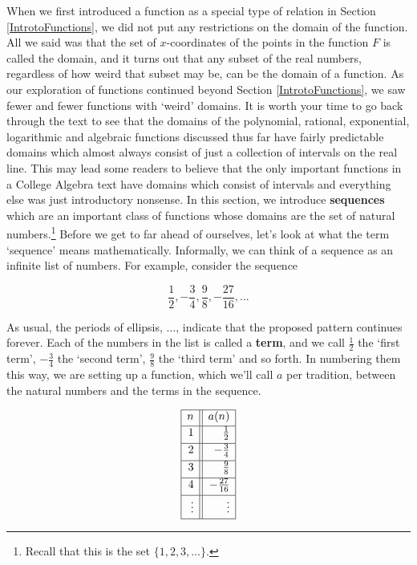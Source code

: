 

\setcounter{footnote}{0}

\label{Sequences}

When we first introduced a function as a special type of relation in Section \ref{IntrotoFunctions}, we did not put any restrictions on the domain of the function.  All we said was that the set of $x$-coordinates of the points in the function $F$ is called the domain, and it turns out that any subset of the real numbers, regardless of how weird that subset may be, can be the domain of a function.  As our exploration of functions continued beyond Section \ref{IntrotoFunctions}, we saw fewer and fewer functions with `weird' domains.  It is worth your time to go back through the text to see that the domains of the polynomial, rational, exponential, logarithmic and algebraic functions discussed thus far have fairly predictable domains which almost always consist of just a collection of intervals on the real line.  This may lead some readers to believe that the only important functions in a College Algebra text have domains which consist of intervals and everything else was just introductory nonsense.  In this section, we introduce \textbf{sequences} which are an important class of functions whose domains are the set of natural numbers.\footnote{Recall that this is the set $\{1, 2, 3, \ldots\}$.}  Before we get to far ahead of ourselves, let's look at what the term `sequence' means mathematically.  Informally, we can think of a sequence as an infinite list of numbers.  For example, consider the sequence

 \begin{equation} \label{seq1} \frac{1}{2}, -\frac{3}{4}, \frac{9}{8}, -\frac{27}{16}, \ldots \tag{1} \end{equation} 

As usual, the periods of  ellipsis, $\ldots$, indicate that the proposed pattern continues forever.  Each of the numbers in the list is called a  \textbf{term}, and we call $\frac{1}{2}$ the `first term', $-\frac{3}{4}$  the `second term', $\frac{9}{8}$  the `third term' and so forth.  In numbering them this way, we are setting up a function, which we'll call $a$ per tradition, between the natural numbers and the terms in the sequence.

\setlength{\extrarowheight}{2pt}

\[ \begin{array}{|r||r|}  \hline

n & a(n)  \\[2pt]  \hline
1  & \frac{1}{2} \\[3pt]  \hline 
2 & -\frac{3}{4}  \\[3pt] \hline 
3 & \frac{9}{8}  \\[3pt] \hline 
4 & -\frac{27}{16}  \\[3pt] \hline 
\vdots & \vdots  \\[2pt] \hline
\end{array} \] 

